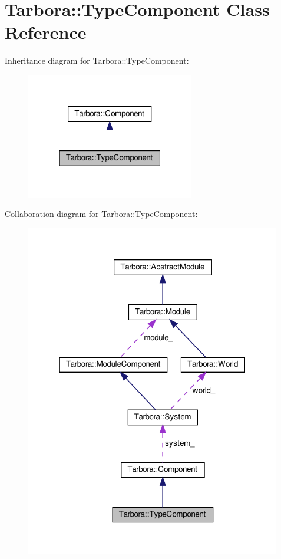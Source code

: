 \hypertarget{classTarbora_1_1TypeComponent}{}\section{Tarbora\+:\+:Type\+Component Class Reference}
\label{classTarbora_1_1TypeComponent}


Inheritance diagram for Tarbora\+:\+:Type\+Component\+:\nopagebreak
\begin{figure}[H]
\begin{center}
\leavevmode
\includegraphics[width=208pt]{classTarbora_1_1TypeComponent__inherit__graph}
\end{center}
\end{figure}


Collaboration diagram for Tarbora\+:\+:Type\+Component\+:\nopagebreak
\begin{figure}[H]
\begin{center}
\leavevmode
\includegraphics[width=316pt]{classTarbora_1_1TypeComponent__coll__graph}
\end{center}
\end{figure}
